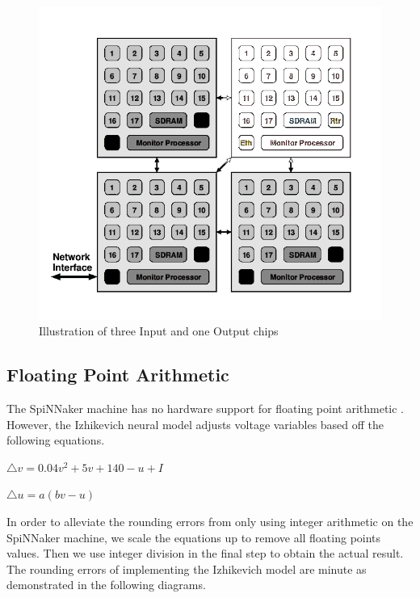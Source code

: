 \documentclass[journal]{./sty/IEEEtran}
\begin{document}
\begin{figure}
\centering
\includegraphics[scale=0.3]{imgs/SpiNN4IO.png}
\caption{Illustration of three Input and one Output chips\label{spinnIO}}
\end{figure}


\subsection{Floating Point Arithmetic}
The SpiNNaker machine has no hardware support for floating point arithmetic \cite{ArchOverV:Furber}. 
However, the Izhikevich neural model adjusts voltage variables based off the following equations.

\begin{math}
\triangle v = 0.04 v^2 + 5 v  + 140 - u + I
\end{math}

\begin{math}
\triangle u = a(b v - u)
\end{math}

In order to alleviate the rounding errors from only using integer arithmetic on the SpiNNaker machine, 
we scale the equations up to remove all floating points values. 
Then we use integer division in the final step to obtain the actual result.
The rounding errors of implementing the Izhikevich model are minute as demonstrated in the following diagrams.
\end{document}
